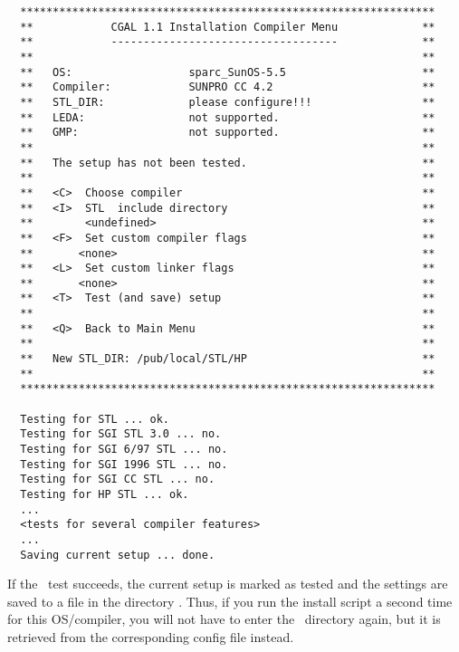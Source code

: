 \begin{scriptsize}
\begin{verbatim}
  ****************************************************************
  **            CGAL 1.1 Installation Compiler Menu             **
  **            -----------------------------------             **
  **                                                            **
  **   OS:                  sparc_SunOS-5.5                     **
  **   Compiler:            SUNPRO CC 4.2                       **
  **   STL_DIR:             please configure!!!                 **
  **   LEDA:                not supported.                      **
  **   GMP:                 not supported.                      **
  **                                                            **
  **   The setup has not been tested.                           **
  **                                                            **
  **   <C>  Choose compiler                                     **
  **   <I>  STL  include directory                              **
  **        <undefined>                                         **
  **   <F>  Set custom compiler flags                           **
  **       <none>                                               **
  **   <L>  Set custom linker flags                             **
  **       <none>                                               **
  **   <T>  Test (and save) setup                               **
  **                                                            **
  **   <Q>  Back to Main Menu                                   **
  **                                                            **
  **   New STL_DIR: /pub/local/STL/HP                           **
  **                                                            **
  ****************************************************************

  Testing for STL ... ok.
  Testing for SGI STL 3.0 ... no.
  Testing for SGI 6/97 STL ... no.
  Testing for SGI 1996 STL ... no.
  Testing for SGI CC STL ... no.
  Testing for HP STL ... ok.
  ...
  <tests for several compiler features>
  ...
  Saving current setup ... done.
\end{verbatim}
\end{scriptsize}

If the \stl\ test succeeds, the current setup is marked as tested and
the settings are saved to a file in the directory \cgalinstconfdir.
Thus, if you run the install script a second time for this
OS/compiler, you will not have to enter the \stl\ directory again, but
it is retrieved from the corresponding config file instead.

